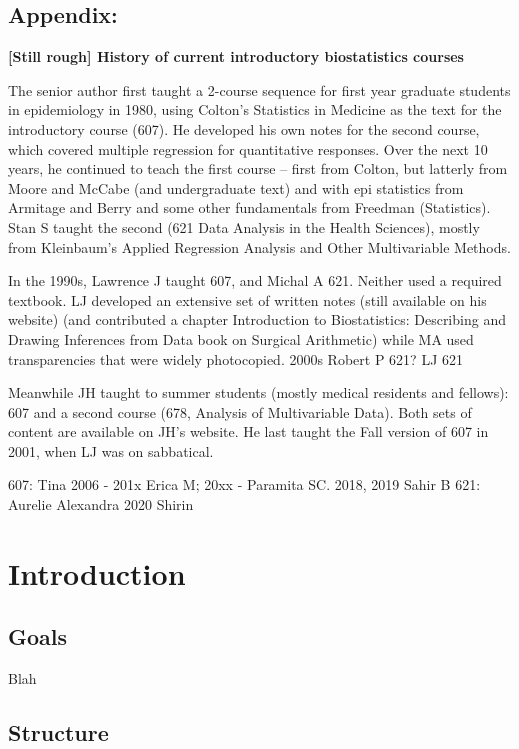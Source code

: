 \documentclass[]{book}
\begin{document}
\hypertarget{appendix}{%
\section{Appendix:}\label{appendix}}

\textbf{{[}Still rough{]} History of current introductory biostatistics courses}

The senior author first taught a 2-course sequence for first year graduate students in epidemiology in 1980, using Colton's Statistics in Medicine as the text for the introductory course (607). He developed his own notes for the second course, which covered multiple regression for quantitative responses. Over the next 10 years, he continued to teach the first course -- first from Colton, but latterly from Moore and McCabe (and undergraduate text) and with epi statistics from Armitage and Berry and some other fundamentals from Freedman
(Statistics). Stan S taught the second (621 Data Analysis in the Health Sciences), mostly from Kleinbaum's Applied Regression Analysis and Other Multivariable Methods.

In the 1990s, Lawrence J taught 607, and Michal A 621. Neither used a required textbook. LJ developed an extensive set of written notes (still available on his website) (and contributed a chapter Introduction to Biostatistics: Describing and Drawing Inferences from Data
book on Surgical Arithmetic) while MA used transparencies that were widely photocopied. 2000s Robert P 621? LJ 621

Meanwhile JH taught to summer students (mostly medical residents and fellows): 607 and a second course (678, Analysis of Multivariable Data). Both sets of content are available on JH's website. He last taught the Fall version of 607 in 2001, when LJ was on sabbatical.

607: Tina 2006 - 201x Erica M; 20xx - Paramita SC. 2018, 2019 Sahir B
621: Aurelie Alexandra 2020 Shirin

\hypertarget{introduction}{%
\chapter{Introduction}\label{introduction}}

\hypertarget{goals}{%
\section{Goals}\label{goals}}

Blah

\hypertarget{structure}{%
\section{Structure}\label{structure}}
\end{document}
